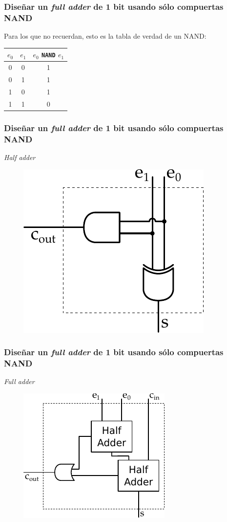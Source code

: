\documentclass[mathserif,hyperref]{beamer}
\begin{document}
\begin{frame}
\frametitle{\small Diseñar un \textit{full adder} de 1 bit usando sólo
compuertas NAND}
Para los que no recuerdan, esto es la tabla de verdad de un NAND:
\begin{center}\begin{tabular}{| c | c || c |}
  \hline
  $e_0$ & $e_1$ & $e_0$ \texttt{NAND} $e_1$ \\ \hline
    0   &   0   &             1             \\
    0   &   1   &             1             \\
    1   &   0   &             1             \\
    1   &   1   &             0             \\
  \hline
\end{tabular}\end{center}
\end{frame}


\begin{frame}
\frametitle{\small Diseñar un \textit{full adder} de 1 bit usando sólo
compuertas NAND}
\textit{Half adder}
\begin{figure}[htp]
  \includegraphics[scale=0.9]{halfadder.pdf}
\end{figure}
\end{frame}


\begin{frame}
\frametitle{\small Diseñar un \textit{full adder} de 1 bit usando sólo
compuertas NAND}
\textit{Full adder}
\begin{figure}[htp]
  \includegraphics[scale=0.9]{fulladder.pdf}
\end{figure}
\end{frame}
\end{document}
